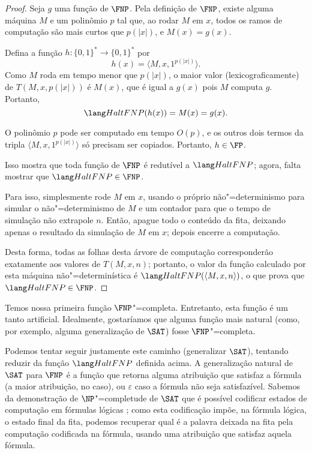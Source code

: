 \begin{proof}
    Seja $g$ uma função de $\FNP$.
    Pela definição de $\FNP$, existe alguma máquina $M$
    e um polinômio $p$ tal que,
    ao rodar $M$ em $x$,
    todos os ramos de computação são mais curtos que $p(|x|)$,
    e $M(x) = g(x)$.

    Defina a função $h: \{0, 1\}^* \to \{0, 1\}^*$
    por
    \begin{equation*}
        h(x) = \langle M, x, 1^{p(|x|)} \rangle.
    \end{equation*}
    Como $M$ roda em tempo menor que $p(|x|)$,
    o maior valor (lexicograficamente) de $T(M, x, p(|x|))$ é $M(x)$,
    que é igual a $g(x)$ pois $M$ computa $g$.
    Portanto,
    \begin{equation*}
        \HaltFNP(h(x)) = M(x) = g(x).
    \end{equation*}

    O polinômio $p$ pode ser computado em tempo $O(p)$,
    e os outros dois termos da tripla $\langle M, x, 1^{p(|x|)} \rangle$
    só precisam ser copiados. Portanto, $h \in \FP$.

    Isso mostra que toda função de $\FNP$ é redutível a $\HaltFNP$;
    agora, falta mostrar que $\HaltFNP \in \FNP$.

    Para isso, simplesmente rode $M$ em $x$,
    usando o próprio não"=determinismo para simular o não"=determinismo de $M$
    e um contador para que o tempo de simulação não extrapole $n$.
    Então, apague todo o conteúdo da fita,
    deixando apenas o resultado da simulação de $M$ em $x$;
    depois encerre a computação.

    Desta forma, todas as folhas desta árvore de computação
    corresponderão exatamente aos valores de $T(M, x, n)$;
    portanto, o valor da função calculado por esta máquina não"=determinística
    é $\HaltFNP(\langle M, x, n \rangle)$,
    o que prova que $\HaltFNP \in \FNP$.
\end{proof}

Temos nossa primeira função $\FNP$"=completa.
Entretanto, esta função é um tanto artificial.
Idealmente, gostaríamos que alguma função mais natural
(como, por exemplo, alguma generalização de $\SAT$)
fosse $\FNP$"=completa.

Podemos tentar seguir justamente este caminho
(generalizar $\SAT$),
tentando reduzir da função $\HaltFNP$ definida acima.
A generalização natural de $\SAT$ para $\FNP$
é a função que retorna alguma atribuição que satisfaz a fórmula
(a maior atribuição, no caso),
ou $\varepsilon$ caso a fórmula não seja satisfazível.
Sabemos da demonstração de $\NP$"=completude de $\SAT$
que é possível codificar estados de computação em fórmulas lógicas
\cite[p.~152--153]{Cook1971};
como esta codificação impõe,
na fórmula lógica,
o estado final da fita,
podemos recuperar qual é a palavra deixada na fita pela computação codificada na fórmula,
usando uma atribuição que satisfaz aquela fórmula.

